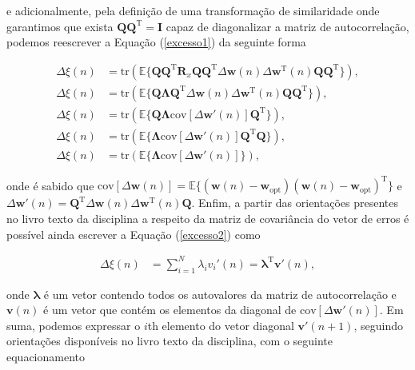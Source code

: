 \begin{enumerate}
        e adicionalmente, pela definição de uma transformação de similaridade onde garantimos que exista $\mathbf{Q} \mathbf{Q}^{\text{T}} = \mathbf{I}$ capaz de diagonalizar a matriz de autocorrelação, podemos reescrever a Equação (\ref{excesso1}) da seguinte forma

        \begin{align}
            \Delta \xi(n) &= \text{tr}(\mathbb{E}\{\mathbf{Q} \mathbf{Q}^{\text{T}} \mathbf{R}_{x} \mathbf{Q} \mathbf{Q}^{\text{T}} \Delta \mathbf{w}(n) \Delta \mathbf{w}^{\text{T}}(n) \mathbf{Q} \mathbf{Q}^{\text{T}}\}), \\
            \Delta \xi(n) &= \text{tr}(\mathbb{E}\{\mathbf{Q} \mathbf{\Lambda} \mathbf{Q}^{\text{T}} \Delta \mathbf{w}(n) \Delta \mathbf{w}^{\text{T}}(n) \mathbf{Q} \mathbf{Q}^{\text{T}}\}), \\
            \Delta \xi(n) &= \text{tr}(\mathbb{E}\{\mathbf{Q} \mathbf{\Lambda} \text{cov} \left[\Delta \mathbf{w}'(n)\right] \mathbf{Q}^{\text{T}}\}), \\
            \Delta \xi(n) &= \text{tr}(\mathbb{E}\{\mathbf{\Lambda} \text{cov} \left[\Delta \mathbf{w}'(n)\right] \mathbf{Q}^{\text{T}} \mathbf{Q}\}), \\
            \Delta \xi(n) &= \text{tr}(\mathbb{E}\{\mathbf{\Lambda} \text{cov} \left[\Delta \mathbf{w}'(n)\right]\}), \label{excesso2}
        \end{align}

        onde é sabido que $\text{cov} \left[\Delta \mathbf{w}(n)\right] = \mathbb{E}\{(\mathbf{w}(n) - \mathbf{w}_{\text{opt}}) (\mathbf{w}(n) - \mathbf{w}_{\text{opt}})^{\text{T}}\}$ e $\Delta \mathbf{w}'(n) = \mathbf{Q}^{\text{T}} \Delta \mathbf{w}(n) \Delta \mathbf{w}^{\text{T}}(n) \mathbf{Q}$.
        Enfim, a partir das orientações presentes no livro texto da disciplina a respeito da matriz de covariância do vetor de erros é possível ainda escrever a Equação (\ref{excesso2}) como

        \begin{align}
            \Delta \xi(n) &= \sum^{N}_{i = 1} \lambda_{i} v_{i}'(n) = \mathbf{\lambda}^{\text{T}} \mathbf{v}'(n),
        \end{align}

        onde $\mathbf{\lambda}$ é um vetor contendo todos os autovalores da matriz de autocorrelação e $\mathbf{v}(n)$ é um vetor que contém os elementos da diagonal de $\text{cov} \left[\Delta \mathbf{w}'(n)\right]$. Em suma, podemos 
        expressar o $i$th elemento do vetor diagonal $\mathbf{v}'(n + 1)$, seguindo orientações disponíveis no livro texto da disciplina, com o seguinte equacionamento


\end{enumerate}
